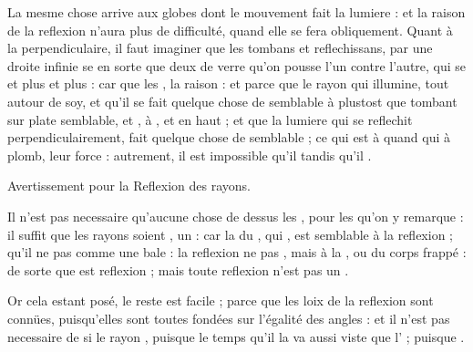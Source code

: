 \documentclass[11pt,a4paper]{article}
\begin{document}
La mesme chose arrive aux  \struck{\ill{}} globes dont le mouvement fait la lumiere : et la \struck{\ill{}} raison de la reflexion n'aura plus de difficulté, quand elle se fera obliquement. Quant à la perpendiculaire, il faut imaginer que les  tombans et reflechissans,  par une droite infinie se  en  sorte que deux \ill{} de verre qu'on pousse l'un contre l'autre, qui se  et  plus  et plus  : car \ill{} que les \ill{} \ill{} \ill{} \ill{}, \ill{} la raison \ill{} \ill{} : et parce que le rayon qui illumine,  tout autour de soy, et qu'il se fait quelque chose de semblable à \ill{} plustost que tombant sur \ill{} \ill{} \ill{} plate semblable, et , \struck{\ill{}}  \ill{} \ill{} à , et en haut ; et que la lumiere qui se reflechit perpendiculairement, fait quelque chose de semblable ; ce qui est  à  quand  \struck{\ill{}}  qui  à plomb,  leur force : autrement, il est impossible qu'il  tandis qu'il .

Avertissement pour la Reflexion des rayons.

Il n'est pas necessaire qu'aucune chose \struck{\ill{}}  de dessus les , pour les  qu'on y remarque : il suffit que les rayons soient ,  un  \struck{\ill{}} : car la  du \ill{}, qui  \ill{}, est semblable à la reflexion ;  qu'il ne  pas comme une bale :  la reflexion ne  pas  , mais \struck{\ill{}} à la , ou  du corps frappé : de sorte que \struck{\ill{}}   est reflexion ; mais toute reflexion n'est pas un .

Or cela estant posé, le reste est facile ; parce que les loix de la reflexion sont connües, puisqu'elles sont toutes fondées sur l'égalité des angles : et il n'est pas necessaire de  \ill{}  si le rayon  \ill{}, puisque le \ill{} \ill{}  \ill{} \ill{} temps qu'il \struck{\ill{}}  la  va aussi viste que l' ; puisque \ill{} \ill{} .
\end{document}
